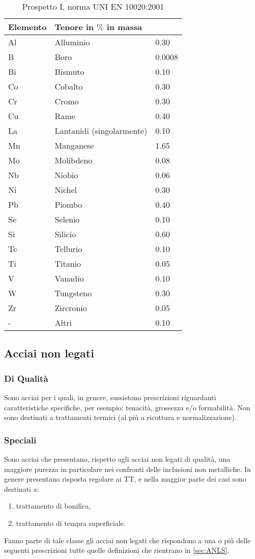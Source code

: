 \begin{table}
\centering
\caption{Prospetto I, norma UNI EN 10020:2001}\label{tab:Prosp1}
\begin{tabularx}{0.5\textwidth}{lXl}
\toprule
\textbf{Elemento} &\textbf{Tenore in $\%$ in massa}\\
\midrule
Al & Alluminio & 0.30\\
B & Boro & 0.0008\\
Bi & Bismuto & 0.10\\
Co & Cobalto & 0.30\\
Cr & Cromo & 0.30\\
Cu & Rame & 0.40\\
La & Lantanidi (singolarmente) & 0.10\\
Mn & Manganese & 1.65\\
Mo & Molibdeno & 0.08\\
Nb & Niobio & 0.06\\
Ni & Nichel & 0.30\\
Pb & Piombo & 0.40\\
Se & Selenio & 0.10\\
Si & Silicio & 0.60\\
Te & Tellurio & 0.10\\
Ti & Titanio & 0.05\\
V & Vanadio & 0.10\\
W & Tungsteno & 0.30\\
Zr & Zircronio & 0.05\\
- & Altri & 0.10\\
\bottomrule
\end{tabularx}
\end{table}

\subsection{Acciai non legati}
\begin{multicols}{2}[]
\subsubsection{Di Qualità}
Sono acciai per i quali, in genere, sussistono prescrizioni riguardanti caratteristiche specifiche, per esempio: tenacità, grossezza e/o formabilità.
Non sono destinati a trattamenti termici (al più a ricottura e normalizzazione).
\columnbreak
\subsubsection{Speciali}
Sono acciai che presentano, rispetto agli acciai non legati di qualità, una maggiore purezza in particolare nei confronti delle inclusioni non metalliche.
In genere presentano risposta regolare ai \ac{TT}, e nella maggior parte dei casi sono destinati a:
\begin{enumerate}
\item trattamento di bonifica,
\item trattamento di tempra superficiale.
\end{enumerate}
Fanno parte di tale classe gli acciai non legati che rispondono a una o più delle seguenti prescrizioni tutte quelle definizioni che rientrano in \ref{sec:ANLS}.
\end{multicols}

